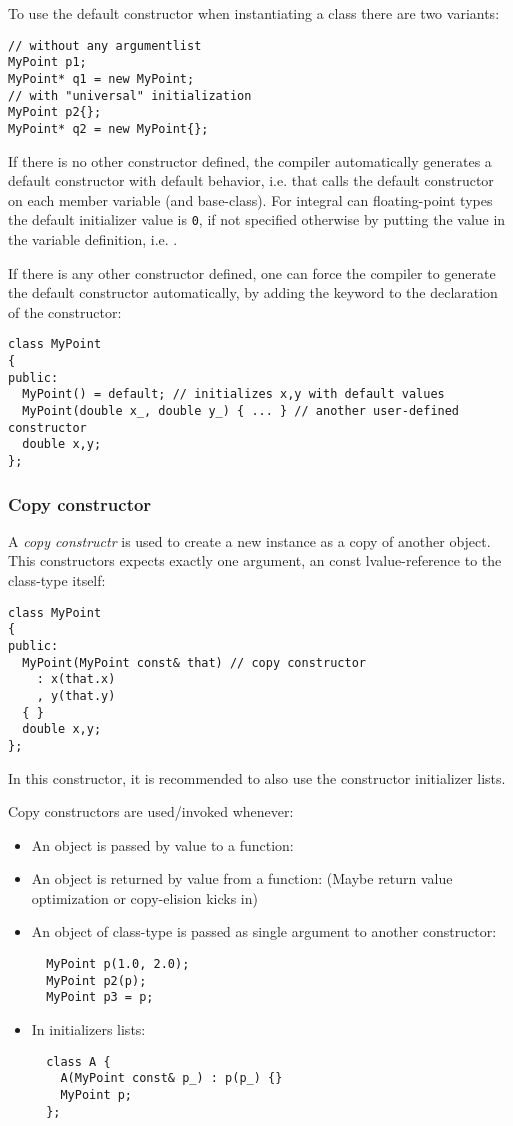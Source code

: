 To use the default constructor when instantiating a class there are two variants:
%
\begin{verbatim}
// without any argumentlist
MyPoint p1;
MyPoint* q1 = new MyPoint;
// with "universal" initialization
MyPoint p2{};
MyPoint* q2 = new MyPoint{};
\end{verbatim}

If there is no other constructor defined, the compiler automatically generates a default constructor with default behavior, i.e. that calls the default constructor
on each member variable (and base-class). For integral can floating-point types the default initializer value is \texttt{0}, if not specified otherwise by
putting the value in the variable definition, i.e. .

If there is any other constructor defined, one can force the compiler to generate the default constructor automatically, by adding the keyword  to
the declaration of the constructor:
%
\begin{verbatim}
class MyPoint
{
public:
  MyPoint() = default; // initializes x,y with default values
  MyPoint(double x_, double y_) { ... } // another user-defined constructor
  double x,y;
};
\end{verbatim}


\subsubsection{Copy constructor}
A \emph{copy constructr} is used to create a new instance as a copy of another object. This constructors expects exactly one argument, an const lvalue-reference
to the class-type itself:
%
\begin{verbatim}
class MyPoint
{
public:
  MyPoint(MyPoint const& that) // copy constructor
    : x(that.x)
    , y(that.y)
  { }
  double x,y;
};
\end{verbatim}
%
In this constructor, it is recommended to also use the constructor initializer lists.

Copy constructors are used/invoked whenever:
\begin{itemize}
  \item An object is passed by value to a function:
  \item An object is returned by value from a function:
    (Maybe return value optimization or copy-elision kicks in)
  \item An object of class-type is passed as single argument to another constructor:
    \begin{verbatim}
  MyPoint p(1.0, 2.0);
  MyPoint p2(p);
  MyPoint p3 = p;
    \end{verbatim}
  \item In initializers lists:
    \begin{verbatim}
  class A {
    A(MyPoint const& p_) : p(p_) {}
    MyPoint p;
  };
    \end{verbatim}
\end{itemize}

